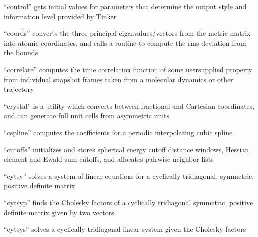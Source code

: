 \documentclass[letterpaper,11pt,english]{sphinxmanual}
\begin{document}

“control” gets initial values for parameters that determine
the output style and information level provided by Tinker


“coords” converts the three principal eigenvalues/vectors from
the metric matrix into atomic coordinates, and calls a routine
to compute the rms deviation from the bounds


“correlate” computes the time correlation function of some
user\sphinxhyphen{}supplied property from individual snapshot frames taken
from a molecular dynamics or other trajectory






“crystal” is a utility which converts between fractional and
Cartesian coordinates, and can generate full unit cells from
asymmetric units


“cspline” computes the coefficients for a periodic interpolating
cubic spline


“cutoffs” initializes and stores spherical energy cutoff
distance windows, Hessian element and Ewald sum cutoffs,
and allocates pairwise neighbor lists


“cytsy” solves a system of linear equations for a cyclically
tridiagonal, symmetric, positive definite matrix


“cytsyp” finds the Cholesky factors of a cyclically tridiagonal
symmetric, positive definite matrix given by two vectors


“cytsys” solves a cyclically tridiagonal linear system
given the Cholesky factors

\end{document}
